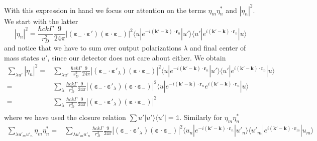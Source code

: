 \documentclass[11pt,letter]{article}
\newcommand{\bv}[1]{\ensuremath{\bm{#1}}}
\begin{document}
With this expression in hand we focus our attention on the terms $\eta_{m}\eta_{n}^{*}$ and $|\eta_{n}|^{2}$.  We start with the latter 
\begin{equation}
 |\eta_{n}|^{2} =  \frac{\hbar c k \Gamma}{r_{D}^{2}}  
    \frac{9}{24\pi} 
       | (\bv{\varepsilon}_{-}\cdot \bv{\varepsilon}' )
                       (\bv{\varepsilon}\cdot \bv{\varepsilon}_{-} ) |^{2}
      \langle u | e^{-i(\bv{k}'-\bv{k}) \cdot\bv{r}_{n}} | u'  \rangle
      \langle u' | e^{i(\bv{k}'-\bv{k}) \cdot\bv{r}_{n}} | u  \rangle
\end{equation}
and notice that we have to sum over output polarizations $\lambda$ and final center of mass states  $u'$, since our detector does not care about either. We obtain 
\begin{equation}
\begin{split}
 \sum_{\lambda u'}|\eta_{n}|^{2} = & \sum_{\lambda u'} \frac{\hbar c k \Gamma}{r_{D}^{2}}  
    \frac{9}{24\pi} 
       | (\bv{\varepsilon}_{-}\cdot \bv{\varepsilon}'_{\lambda} )
                       (\bv{\varepsilon}\cdot \bv{\varepsilon}_{-} ) |^{2}
      \langle u | e^{-i(\bv{k}'-\bv{k}) \cdot\bv{r}_{n}} | u'  \rangle
      \langle u' | e^{i(\bv{k}'-\bv{k}) \cdot\bv{r}_{n}} | u  \rangle \\
 = & \sum_{\lambda} \frac{\hbar c k \Gamma}{r_{D}^{2}}  
    \frac{9}{24\pi} 
       | (\bv{\varepsilon}_{-}\cdot \bv{\varepsilon}'_{\lambda} )
                       (\bv{\varepsilon}\cdot \bv{\varepsilon}_{-} ) |^{2}
      \langle u | e^{-i(\bv{k}'-\bv{k}) \cdot\bv{r}_{n}}  e^{i(\bv{k}'-\bv{k}) \cdot\bv{r}_{n}} | u  \rangle \\
 = & \sum_{\lambda} \frac{\hbar c k \Gamma}{r_{D}^{2}}  
    \frac{9}{24\pi} 
       | (\bv{\varepsilon}_{-}\cdot \bv{\varepsilon}'_{\lambda} )
                       (\bv{\varepsilon}\cdot \bv{\varepsilon}_{-} ) |^{2} \\
\end{split}
\end{equation}
where we have used the closure relation $\sum{u'}|u'\rangle\langle u'| = \mathbb{1}$.
Similarly for $\eta_{m}\eta_{n}^{*}$
\begin{equation}
\begin{split}
 \sum_{\lambda u'_{m} u'_{n}} \eta_{m}\eta_{n}^{*} = & 
 \sum_{\lambda u'_{m} u'_{n}} \frac{\hbar c k \Gamma}{r_{D}^{2}}  
    \frac{9}{24\pi} 
       | (\bv{\varepsilon}_{-}\cdot \bv{\varepsilon}'_{\lambda} )
                       (\bv{\varepsilon}\cdot \bv{\varepsilon}_{-} ) |^{2}
      \langle u_{n} | e^{-i(\bv{k}'-\bv{k}) \cdot\bv{r}_{n}} | u'_{n}  \rangle
      \langle u'_{m} | e^{i(\bv{k}'-\bv{k}) \cdot\bv{r}_{m}} | u_{m}  \rangle \\
\end{split}
\end{equation}
\end{document}
